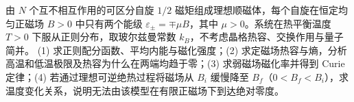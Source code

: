 由 \(N\) 个互不相互作用的可区分自旋 \(1/2\) 磁矩组成理想顺磁体，每个自旋在恒定均匀正磁场 \(B>0\) 中只有两个能级 \(\varepsilon_\pm=\mp\mu B\)，其中 \(\mu>0\)。系统在热平衡温度 \(T>0\) 下服从正则分布，取玻尔兹曼常数 \(k_B\)，不考虑晶格热容、交换作用与量子简并。
(1) 求正则配分函数、平均内能与磁化强度；(2) 求定磁场热容与熵，分析高温和低温极限及热容为什么在两端均趋于零；(3) 求弱磁场磁化率并得到 Curie 定律；(4) 若通过理想可逆绝热过程将磁场从 \(B_i\) 缓慢降至 \(B_f\)（\(0<B_f<B_i\)），求温度变化关系，说明无法由该模型在有限正磁场下到达绝对零度。

